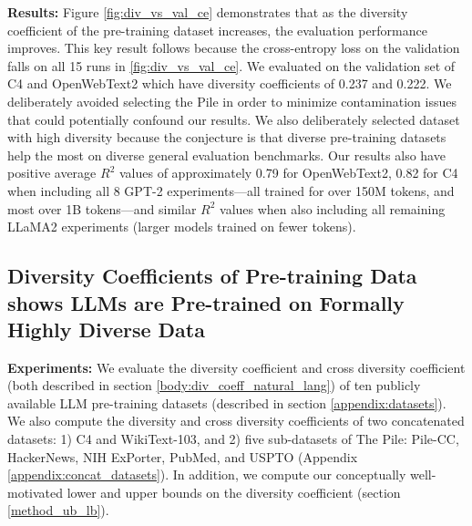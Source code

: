 \documentclass[10pt]{article} %
\begin{document}
\textbf{Results: }
Figure \ref{fig:div_vs_val_ce} demonstrates that as the diversity coefficient of the pre-training dataset increases, the evaluation performance improves. 
This key result follows because the cross-entropy loss on the validation falls on all 15 runs in \ref{fig:div_vs_val_ce}. 
We evaluated on the validation set of C4 and OpenWebText2 which have diversity coefficients of 0.237 and 0.222. 
We deliberately avoided selecting the Pile in order to minimize contamination issues that could potentially confound our results. 
We also deliberately selected dataset with high diversity because the conjecture is that diverse pre-training datasets help the most on diverse general evaluation benchmarks. 
Our results also have positive average $R^2$ values of approximately 0.79 for OpenWebText2, 0.82 for C4 when including all 8 GPT-2 experiments---all trained for over 150M tokens, and most over 1B tokens---and similar $R^2$ values when also including all remaining LLaMA2 experiments (larger models trained on fewer tokens). 

\subsection{Diversity Coefficients of Pre-training Data shows LLMs are Pre-trained on Formally Highly Diverse Data}

\textbf{Experiments:} 
We evaluate the diversity coefficient and cross diversity coefficient (both described in section \ref{body:div_coeff_natural_lang}) of ten publicly available LLM pre-training datasets (described in section \ref{appendix:datasets}).
We also compute the diversity and cross diversity coefficients of two concatenated datasets: 
1) C4 and WikiText-103, and 
2) five sub-datasets of The Pile: Pile-CC, HackerNews, NIH ExPorter, PubMed, and USPTO (Appendix \ref{appendix:concat_datasets}).
In addition, we compute our conceptually well-motivated lower and upper bounds on the diversity coefficient (section \ref{method_ub_lb}).
\end{document}

